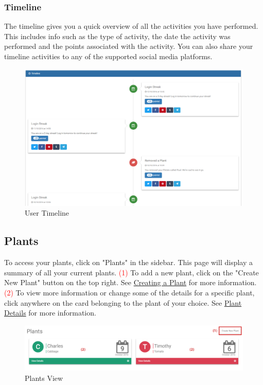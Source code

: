 \documentclass{article}
\begin{document}
	\subsubsection{Timeline}
	The timeline gives you a quick overview of all the activities you have performed. This includes info such as the type of activity, the date the activity was performed and the points associated with the activity. You can also share your timeline activities to any of the supported social media platforms.
	\begin{figure}[H]
		\includegraphics[width=\textwidth]{../images/UserManual/timeline.png}
		\caption{User Timeline}
	\end{figure}

	\subsection{Plants}
	To access your plants, click on "Plants" in the sidebar. This page will display a summary of all your current plants.
	\newline
	\textcolor{red}{(1)} To add a new plant, click on the "Create New Plant" button on the top right. See \hyperref[sec:creating-a-plant]{Creating a Plant} for more information.
	\newline
	\textcolor{red}{(2)} To view more information or change some of the details for a specific plant, click anywhere on the card belonging to the plant of your choice. See \hyperref[sec:plant-details]{Plant Details} for more information.
	\begin{figure}[H]
		\includegraphics[width=\textwidth]{../images/UserManual/plants.png}
		\caption{Plants View}
	\end{figure}
		
\end{document}
